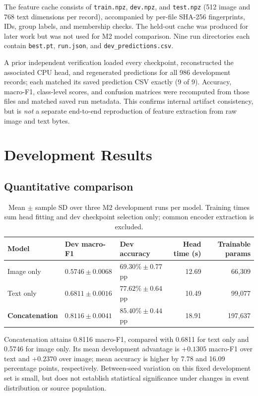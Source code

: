 \documentclass[11pt,a4paper]{article}
\begin{document}
The feature cache consists of \texttt{train.npz}, \texttt{dev.npz}, and \texttt{test.npz} (512 image and 768 text dimensions per record), accompanied by per-file SHA-256 fingerprints, IDs, group labels, and membership checks. The held-out cache was produced for later work but was not used for M2 model comparison. Nine run directories each contain \texttt{best.pt}, \texttt{run.json}, and \texttt{dev\_predictions.csv}.

A prior independent verification loaded every checkpoint, reconstructed the associated CPU head, and regenerated predictions for all 986 development records; each matched its saved prediction CSV exactly (9 of 9). Accuracy, macro-F1, class-level scores, and confusion matrices were recomputed from those files and matched saved run metadata. This confirms internal artifact consistency, but is \emph{not} a separate end-to-end reproduction of feature extraction from raw image and text bytes.

\section{Development Results}
\subsection{Quantitative comparison}
\begin{table}[htbp]
\centering\small
\caption{Mean $\pm$ sample SD over three M2 development runs per model. Training times sum head fitting and dev checkpoint selection only; common encoder extraction is excluded.}
\label{tab:mainresults}
\begin{tabularx}{\linewidth}{@{}l>{\centering\arraybackslash}X>{\centering\arraybackslash}Xrr@{}}
\toprule
Model & Dev macro-F1 & Dev accuracy & Head time (s) & Trainable params \\
\midrule
Image only & $0.5746\pm0.0068$ & $69.30\%\pm0.77$ pp & 12.69 & 66,309 \\
Text only & $0.6811\pm0.0016$ & $77.62\%\pm0.64$ pp & 10.49 & 99,077 \\
\textbf{Concatenation} & $\mathbf{0.8116\pm0.0041}$ & $\mathbf{85.40\%\pm0.44}$ pp & 18.91 & 197,637 \\
\bottomrule
\end{tabularx}
\end{table}
Concatenation attains 0.8116 macro-F1, compared with 0.6811 for text only and 0.5746 for image only. Its mean development advantage is $+0.1305$ macro-F1 over text and $+0.2370$ over image; mean accuracy is higher by 7.78 and 16.09 percentage points, respectively. Between-seed variation on this fixed development set is small, but does not establish statistical significance under changes in event distribution or source population.
\end{document}
